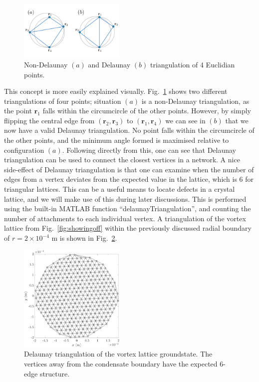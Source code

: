 \begin{figure}\centering
    \includegraphics[width=0.45\textwidth]{Images/ch6_phasegineer/imgs/delaun}
    \caption{Non-Delaunay $(a)$ and Delaunay $(b)$ triangulation of 4 Euclidian points.}\label{fig:delaun}
\end{figure}
This concept is more easily explained visually. Fig.~\ref{fig:delaun} shows two different triangulations of four points; situation $(a)$ is a non-Delaunay triangulation, as the point $\mathbf{r}_1$ falls within the circumcircle of the other points. However, by simply flipping the central edge from $(\mathbf{r}_2, \mathbf{r}_3)$ to $(\mathbf{r}_1, \mathbf{r}_4)$ we can see in $(b)$ that we now have a valid Delaunay triangulation. No point falls within the circumcircle of the other points, and the minimum angle formed is maximised relative to configuration $(a)$. Following directly from this, one can see that Delaunay triangulation can be used to connect the closest vertices in a network. A nice side-effect of Delaunay triangulation is that one can examine when the number of edges from a vertex deviates from the expected value in the lattice, which is 6 for triangular lattices. This can be a useful means to locate defects in a crystal lattice, and we will make use of this during later discussions. This is performed using the built-in \textsc{MATLAB} function ``delaunayTriangulation'', and counting the number of attachments to each individual vertex. A triangulation of the vortex lattice from Fig.~\ref{fig:showingoff} within the previously discussed radial boundary of $r=2\times 10^{-4}$ m is shown in Fig.~\ref{fig:delaun_vtxlatt}.

\begin{figure}\centering
    \includegraphics[width=0.45\textwidth]{Images/ch4_vtx/Del_tr_VTXLATT}
    \caption{Delaunay triangulation of the vortex lattice groundstate. The vertices away from the condensate boundary have the expected 6-edge structure.}\label{fig:delaun_vtxlatt}
\end{figure}

